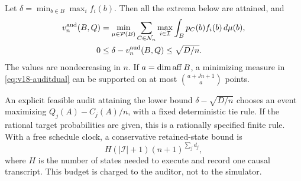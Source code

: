 \begin{theorem}
\label{thm:v18-audit}
Let $\delta=\min_{b\in B}\max_i f_i(b)$. Then all the extrema below are
attained, and
\begin{align}
 v^{\rm aud}_n(B,Q)
 &=\min_{\mu\in\mathcal P(B)}
       \sum_{C\in\mathcal N_n}\max_{i\in\mathcal I}
                  \int_B p_C(b)f_i(b)\,d\mu(b),
                    \label{eq:v18-auditdual}\\
 0&\le\delta-v^{\rm aud}_n(B,Q)\le\sqrt{D/n}.
                    \label{eq:v18-auditrate}
\end{align}
The values are nondecreasing in $n$. If $a=\dim\operatorname{aff} B$, a minimizing
measure in \eqref{eq:v18-auditdual} can be supported on at most
$\binom{a+Jn+1}{a}$ points.

An explicit feasible audit attaining the lower bound
$\delta-\sqrt{D/n}$ chooses an event maximizing
$Q_j(A)-C_j(A)/n$, with a fixed deterministic tie rule. If the rational
target probabilities are given, this is a rationally specified finite
rule. With a free schedule clock, a conservative retained-state bound is
\[
 H(|\mathcal I|+1)(n+1)^{\sum_jd_j},
\]
where $H$ is the number of states needed to execute and record one causal
transcript. This budget is charged to the auditor, not to the simulator.
\end{theorem}
